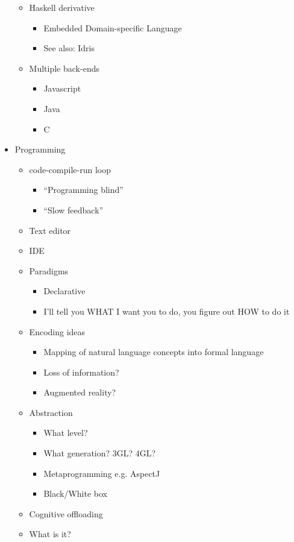 \documentclass[11pt,openright,a4paper]{report}
\begin{document}
\begin{itemize}
\begin{itemize}
		\item Haskell derivative
		\begin{itemize}
			\item Embedded Domain-specific Language
			\item See also: Idris
		\end{itemize}
		\item Multiple back-ends
		\begin{itemize}
			\item Javascript
			\item Java
			\item C
		\end{itemize}
	\end{itemize}
	\item Programming
	\begin{itemize}
		\item code-compile-run loop
		\begin{itemize}
			\item ``Programming blind''
			\item ``Slow feedback''
		\end{itemize}
		\item Text editor
		\item IDE
		\item Paradigms
		\begin{itemize}
			\item Declarative
			\item I'll tell you WHAT I want you to do, you
			      figure out HOW to do it
		\end{itemize}
		\item Encoding ideas
		\begin{itemize}
			\item Mapping of natural language concepts into formal language
			\item Loss of information?
			\item Augmented reality?
		\end{itemize}
		\item Abstraction
		\begin{itemize}
			\item What level?
			\item What generation? 3GL? 4GL?
			\item Metaprogramming e.g. AspectJ
			\item Black/White box
		\end{itemize}
		\item Cognitive offloading
		\item What is it?

\end{itemize}
\end{itemize}
\end{document}

